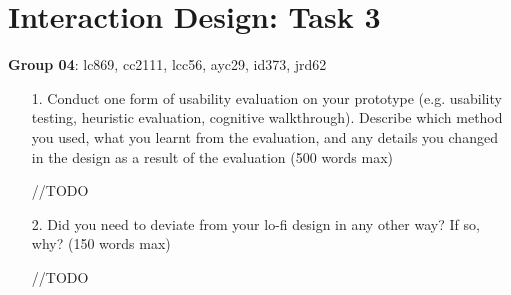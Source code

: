 \documentclass[10pt,a4paper]{article}
\begin{document}
\section*{Interaction Design: Task 3}

\textbf{Group 04}: lc869, cc2111, lcc56, ayc29, id373, jrd62

\begin{enumerate}
	\item[1.]Conduct one form of usability evaluation on your prototype (e.g. usability testing, heuristic evaluation, cognitive walkthrough). Describe which method you used, what you learnt from the evaluation, and any details you changed in the design as a result of the evaluation (500 words max)
 
	//TODO
	\item[2.] Did you need to deviate from your lo-fi design in any other way? If so, why? (150 words max)
 
	//TODO
\end{enumerate}
\end{document}
